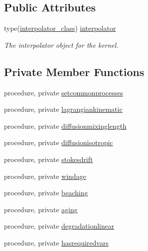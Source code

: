 \subsection*{Public Attributes}
\begin{DoxyCompactItemize}
\item 
type(\mbox{\hyperlink{structinterpolator__mod_1_1interpolator__class}{interpolator\+\_\+class}}) \mbox{\hyperlink{structkernel__mod_1_1kernel__class_a9ad0ab75e7c6a0eff5e24d9d5cd3a72d}{interpolator}}
\begin{DoxyCompactList}\small\item\em The interpolator object for the kernel. \end{DoxyCompactList}\end{DoxyCompactItemize}
\subsection*{Private Member Functions}
\begin{DoxyCompactItemize}
\item 
procedure, private \mbox{\hyperlink{structkernel__mod_1_1kernel__class_a45e76f467fa1c842416d4daf722d92ae}{setcommonprocesses}}
\item 
procedure, private \mbox{\hyperlink{structkernel__mod_1_1kernel__class_a955d89ed307afca4483f2ac06c03d8f6}{lagrangiankinematic}}
\item 
procedure, private \mbox{\hyperlink{structkernel__mod_1_1kernel__class_a1ba4a72f6cfb6f6d9462d89714d035d5}{diffusionmixinglength}}
\item 
procedure, private \mbox{\hyperlink{structkernel__mod_1_1kernel__class_ade7a7d02085be709e7867735294e82a9}{diffusionisotropic}}
\item 
procedure, private \mbox{\hyperlink{structkernel__mod_1_1kernel__class_ae728ca6b395be36077c1d3d51f36cf25}{stokesdrift}}
\item 
procedure, private \mbox{\hyperlink{structkernel__mod_1_1kernel__class_a3505f9e73946acb3d427023cd542f39e}{windage}}
\item 
procedure, private \mbox{\hyperlink{structkernel__mod_1_1kernel__class_a8fb79882cea4947812f75cb3e39c9617}{beaching}}
\item 
procedure, private \mbox{\hyperlink{structkernel__mod_1_1kernel__class_a7366a75fd76c37804607b466cf4f0212}{aging}}
\item 
procedure, private \mbox{\hyperlink{structkernel__mod_1_1kernel__class_a03d66a6a01bf605d9fca2f5636548993}{degradationlinear}}
\item 
procedure, private \mbox{\hyperlink{structkernel__mod_1_1kernel__class_ae32f72181313bee935a0ded1885c3602}{hasrequiredvars}}
\end{DoxyCompactItemize}


